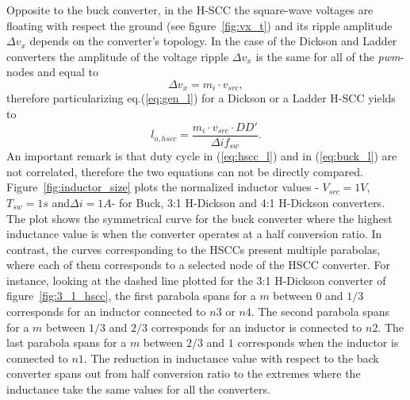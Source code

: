 Opposite to the buck converter, in the H-SCC the square-wave voltages are floating with respect the ground (see figure~\ref{fig:vx_t}) and its ripple amplitude $\Delta v_x$ depends on the converter's topology. In the case of the Dickson and Ladder converters the amplitude of the voltage ripple $\Delta v_x$ is the same for all of the \emph{pwm}-nodes and equal to
\begin{equation}
 \Delta v_x   = m_i \cdot v_{src},
\label{eq:h_scc_Del_vx}
\end{equation}
therefore particularizing eq.(\ref{eq:gen_l}) for a Dickson or a Ladder H-SCC yields to
\begin{equation}
 l_{o,hscc}  = \frac{ m_i \cdot v_{src} \cdot DD'}{\Delta i f_{sw} }.
\label{eq:hscc_l}
\end{equation}
An important remark is that duty cycle in (\ref{eq:hscc_l}) and in (\ref{eq:buck_l}) are not correlated, therefore the two equations can not be directly compared.  Figure~\ref{fig:inductor_size} plots the normalized inductor values - $V_{src} = 1V$, $T_{sw}=1s$ and$\Delta i = 1A$- for Buck, 3:1 H-Dickson and 4:1 H-Dickson converters. The plot shows the symmetrical curve for the buck converter where the highest inductance value is when the converter operates at a half conversion ratio.
In contrast, the curves corresponding to the HSCCs present multiple parabolas, where each of them corresponds to a selected node of the HSCC converter. For instance, looking at the dashed line plotted for the 3:1 H-Dickson converter of figure~\ref{fig:3_1_hscc}, the first parabola spans for a $m$ between $0$ and $1/3$ corresponds for an inductor connected to $n3$ or $n4$. The second parabola spans for a $m$ between $1/3$ and $2/3$ corresponds for an inductor is connected to $n2$. The last parabola spans for a $m$ between $2/3$ and $1$ corresponds when the inductor is connected to $n1$.
The reduction in inductance value with respect to the back converter spans out from half conversion ratio to the extremes where the inductance take the same values for all the converters.


